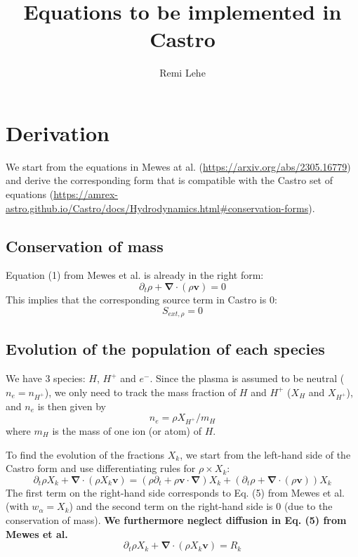 \documentclass[11pt, oneside]{article}   	%
\title{Equations to be implemented in Castro}
\author{Remi Lehe}
\begin{document}
\maketitle

\section{Derivation}

We start from the equations in Mewes at al. (\url{https://arxiv.org/abs/2305.16779}) and derive the corresponding form that is compatible with the Castro set of equations (\url{https://amrex-astro.github.io/Castro/docs/Hydrodynamics.html#conservation-forms}).

\subsection{Conservation of mass}

Equation (1) from Mewes et al. is already in the right form:
\[ \partial_t \rho + \boldsymbol{\nabla}\cdot( \rho\boldsymbol{v} ) = 0  \]
This implies that the corresponding source term in Castro is 0:
\[ S_{ext,\rho} = 0 \]

\subsection{Evolution of the population of each species}

We have 3 species: $H$, $H^+$ and $e^{-}$. Since the plasma is assumed to be neutral ($n_e = n_{H^+}$), we only need to track the mass fraction of $H$ and $H^+$ ($X_H$ and $X_{H^+}$), and $n_e$ is then given by
\[ n_e = \rho X_{H^+} / m_H \]
where $m_H$ is the mass of one ion (or atom) of $H$.

To find the evolution of the fractions $X_k$, we start from the left-hand side of the Castro form and use differentiating rules for $\rho \times X_k$:
\[ \partial_t \rho X_k + \boldsymbol{\nabla}\cdot( \rho X_k \boldsymbol{v} ) =  (\rho\partial_t + \rho \boldsymbol{v}\cdot\boldsymbol{\nabla})X_k + (\partial_t \rho + \boldsymbol{\nabla}\cdot(\rho \boldsymbol{v} ) ) X_k\]
The first term on the right-hand side corresponds to Eq. (5) from Mewes et al. (with $w_\alpha = X_k$) and the second term on the right-hand side is 0 (due to the conservation of mass). \textbf{We furthermore neglect diffusion in Eq. (5) from Mewes et al.}
\[ \partial_t \rho X_k + \boldsymbol{\nabla}\cdot( \rho X_k \boldsymbol{v} ) = R_k \]
\end{document}
